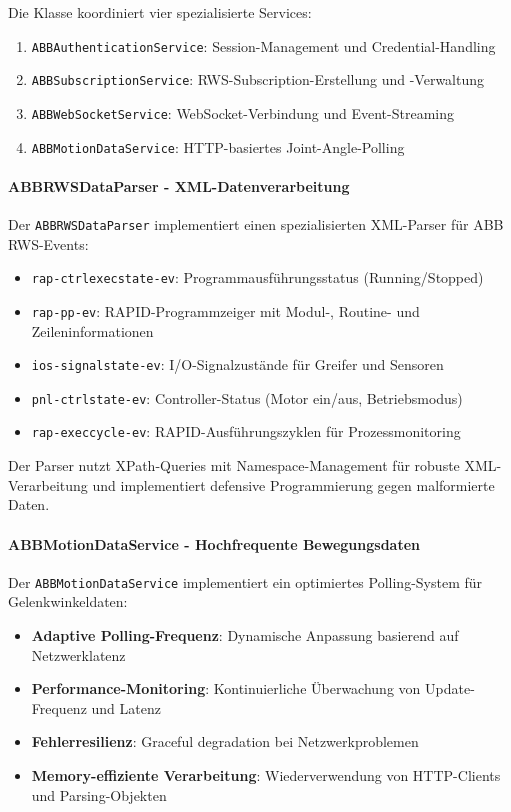 Die Klasse koordiniert vier spezialisierte Services:
\begin{enumerate}
    \item \texttt{ABBAuthenticationService}: Session-Management und Credential-Handling
    \item \texttt{ABBSubscriptionService}: RWS-Subscription-Erstellung und -Verwaltung
    \item \texttt{ABBWebSocketService}: WebSocket-Verbindung und Event-Streaming
    \item \texttt{ABBMotionDataService}: HTTP-basiertes Joint-Angle-Polling
\end{enumerate}

\paragraph{ABBRWSDataParser - XML-Datenverarbeitung}
Der \texttt{ABBRWSDataParser} implementiert einen spezialisierten XML-Parser
für ABB RWS-Events:

\begin{itemize}
    \item \texttt{rap-ctrlexecstate-ev}: Programmausführungsstatus (Running/Stopped)
    \item \texttt{rap-pp-ev}: RAPID-Programmzeiger mit Modul-, Routine- und Zeileninformationen
    \item \texttt{ios-signalstate-ev}: I/O-Signalzustände für Greifer und Sensoren
    \item \texttt{pnl-ctrlstate-ev}: Controller-Status (Motor ein/aus, Betriebsmodus)
    \item \texttt{rap-execcycle-ev}: RAPID-Ausführungszyklen für Prozessmonitoring
\end{itemize}

Der Parser nutzt XPath-Queries mit Namespace-Management für robuste
XML-Verarbeitung und implementiert defensive Programmierung gegen malformierte
Daten.

\paragraph{ABBMotionDataService - Hochfrequente Bewegungsdaten}
Der \texttt{ABBMotionDataService} implementiert ein optimiertes Polling-System
für Gelenkwinkeldaten:

\begin{itemize}
    \item \textbf{Adaptive Polling-Frequenz}: Dynamische Anpassung basierend auf Netzwerklatenz
    \item \textbf{Performance-Monitoring}: Kontinuierliche Überwachung von Update-Frequenz und Latenz
    \item \textbf{Fehlerresilienz}: Graceful degradation bei Netzwerkproblemen
    \item \textbf{Memory-effiziente Verarbeitung}: Wiederverwendung von HTTP-Clients und Parsing-Objekten
\end{itemize}

